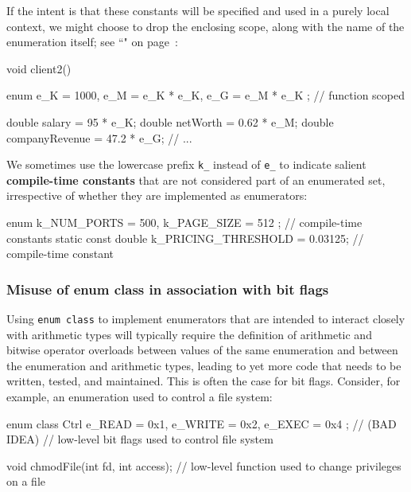 \noindent If the intent is that these constants will be specified and used in a
purely local context, we might choose to drop the enclosing scope, along
with the name of the enumeration itself; see ``" on page~\pageref{local-types-as-template-arguments}:

\begin{emcppslisting}
void client2()
{
    enum { e_K = 1000, e_M = e_K * e_K, e_G = e_M * e_K };  // function scoped

    double salary = 95 * e_K;
    double netWorth = 0.62 * e_M;
    double companyRevenue = 47.2 * e_G;
    // ...
}
\end{emcppslisting}

\noindent We sometimes use the
lowercase prefix \texttt{k\_} instead of \texttt{e\_} to indicate
salient \textbf{compile-time constants} that are not considered part
of an enumerated set, irrespective of whether they are implemented as
enumerators:

\begin{emcppslisting}[basicstyle={\ttfamily\footnotesize}]
enum { k_NUM_PORTS = 500, k_PAGE_SIZE = 512 };     // compile-time constants
static const double k_PRICING_THRESHOLD = 0.03125; // compile-time constant
\end{emcppslisting}

\subsubsection[Misuse of {\tt enum} {\tt class} in association with bit flags]{Misuse of {\SubsubsecCode enum} {\SubsubsecCode class} in association with bit flags}\label{misuse-of-enum-class-in-association-with-bit-flags}

Using \texttt{enum}~\texttt{class} to implement enumerators that are
intended to interact closely with arithmetic types will typically
require the definition of arithmetic and bitwise operator overloads
between values of the same enumeration and between the enumeration and
arithmetic types, leading to yet more code that needs to be written,
tested, and maintained. This is often the case for bit flags. Consider, for example, an
enumeration used to control a file system:

\begin{emcppslisting}[emcppsbatch=e14]
enum class Ctrl { e_READ = 0x1, e_WRITE = 0x2, e_EXEC = 0x4 };  // (BAD IDEA)
    // low-level bit flags used to control file system

void chmodFile(int fd, int access);
    // low-level function used to change privileges on a file
\end{emcppslisting}

